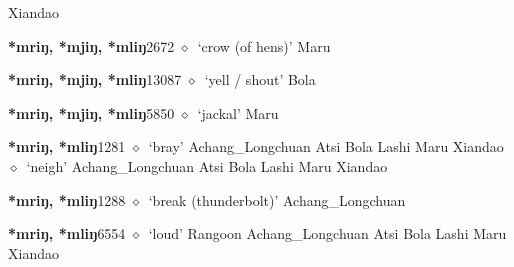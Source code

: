 \begin{list}{}{\leftmargin=1.5em \itemindent=-1.5em}
         Xiandao 
  \item {\footnotesize \textbf{*mriŋ, *mjiŋ, *mliŋ}}{\tiny 2672}
\hspace{1ex}
         $\diamond$~`crow (of hens)'
         Maru 
  \item {\footnotesize \textbf{*mriŋ, *mjiŋ, *mliŋ}}{\tiny 13087}
\hspace{1ex}
         $\diamond$~`yell / shout'
         Bola 
  \item {\footnotesize \textbf{*mriŋ, *mjiŋ, *mliŋ}}{\tiny 5850}
\hspace{1ex}
         $\diamond$~`jackal'
         Maru 
  \item {\footnotesize \textbf{*mriŋ, *mliŋ}}{\tiny 1281}
\hspace{1ex}
         $\diamond$~`bray'
         Achang\_Longchuan 
\hspace{1ex}
         Atsi 
\hspace{1ex}
         Bola 
\hspace{1ex}
         Lashi 
\hspace{1ex}
         Maru 
\hspace{1ex}
         Xiandao 
\hspace{1ex}
         $\diamond$~`neigh'
         Achang\_Longchuan 
\hspace{1ex}
         Atsi 
\hspace{1ex}
         Bola 
\hspace{1ex}
         Lashi 
\hspace{1ex}
         Maru 
\hspace{1ex}
         Xiandao 
  \item {\footnotesize \textbf{*mriŋ, *mliŋ}}{\tiny 1288}
\hspace{1ex}
         $\diamond$~`break (thunderbolt)'
         Achang\_Longchuan 
  \item {\footnotesize \textbf{*mriŋ, *mliŋ}}{\tiny 6554}
\hspace{1ex}
         $\diamond$~`loud'
         Rangoon 
\hspace{1ex}
         Achang\_Longchuan 
\hspace{1ex}
         Atsi 
\hspace{1ex}
         Bola 
\hspace{1ex}
         Lashi 
\hspace{1ex}
         Maru 
\hspace{1ex}
         Xiandao 
  \end{list}

